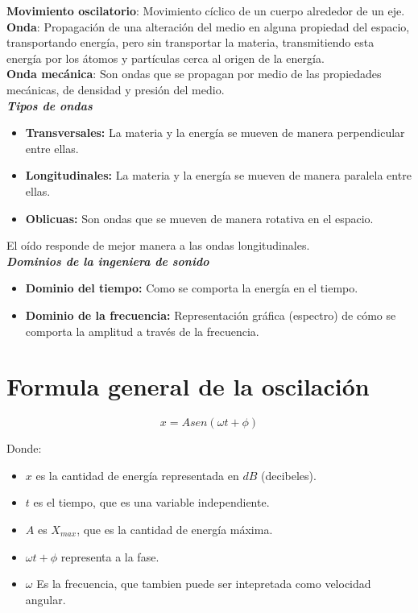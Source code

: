 \documentclass{article}
\begin{document}
\textbf{Movimiento oscilatorio}: Movimiento cíclico de un cuerpo alrededor de un eje.\\

\textbf{Onda}: Propagación de una alteración del medio en alguna propiedad del espacio, transportando energía, pero sin transportar la materia, transmitiendo esta energía por los átomos y partículas cerca al origen de la energía.\\

\textbf{Onda mecánica}: Son ondas que se propagan por medio de las propiedades mecánicas, de densidad y presión del medio.\\

\textbf{\textit{Tipos de ondas}}

\begin{itemize}
    \item \textbf{Transversales:} La materia y la energía se mueven de manera perpendicular entre ellas.
    \item \textbf{Longitudinales:} La materia y la energía se mueven de manera paralela entre ellas. 
    \item \textbf{Oblicuas:} Son ondas que se mueven de manera rotativa en el espacio.
\end{itemize}

El oído responde de mejor manera a las ondas longitudinales.\\

\textbf{\textit{Dominios de la ingeniera de sonido}}

\begin{itemize}
    \item \textbf{Dominio del tiempo:} Como se comporta la energía en el tiempo.
    \item \textbf{Dominio de la frecuencia:}  Representación gráfica (espectro) de cómo se comporta la amplitud a través de la frecuencia.
\end{itemize}

\section{Formula general de la oscilación}

\[ x = Asen(\omega t + \phi) \]

Donde:

\begin{itemize}
    \item $x$ es la cantidad de energía representada en $dB$ (decibeles).
    \item $t$ es el tiempo, que es una variable independiente.
    \item $A$ es $X_{max}$, que es la cantidad de energía máxima.
    \item $\omega t + \phi$ representa a la fase.
    \item $\omega$ Es la frecuencia, que tambien puede ser intepretada como velocidad angular.
\end{itemize}
\end{document}
